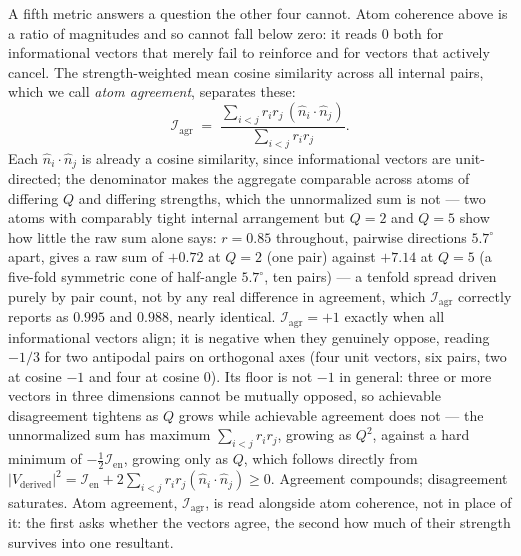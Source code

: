 \documentclass[12pt, a4paper]{article}
\begin{document}
A fifth metric answers a question the other four cannot. Atom
coherence above is a ratio of magnitudes and so cannot fall below
zero: it reads $0$ both for informational vectors that merely fail
to reinforce and for vectors that actively cancel. The
strength-weighted mean cosine similarity across all internal pairs,
which we call \emph{atom agreement}, separates these:
\begin{equation}
    \mathcal{I}_{\mathrm{agr}} \;=\;
    \frac{\sum_{i<j} r_i r_j\,(\hat n_i\cdot\hat n_j)}
         {\sum_{i<j} r_i r_j}.
    \label{eq:internal_alignment}
\end{equation}
Each $\hat n_i\cdot\hat n_j$ is already a cosine similarity, since
informational vectors are unit-directed; the denominator makes the
aggregate comparable across atoms of differing $Q$ and differing
strengths, which the unnormalized sum is not --- two atoms with
comparably tight internal arrangement but $Q=2$ and $Q=5$ show how
little the raw sum alone says: $r=0.85$ throughout, pairwise
directions $5.7^\circ$ apart, gives a raw sum of $+0.72$ at $Q=2$
(one pair) against $+7.14$ at $Q=5$ (a five-fold symmetric cone of
half-angle $5.7^\circ$, ten pairs) --- a tenfold spread driven purely by
pair count, not by any real difference in agreement, which
$\mathcal{I}_{\mathrm{agr}}$ correctly reports as $0.995$ and $0.988$,
nearly identical. $\mathcal{I}_{\mathrm{agr}}=+1$ exactly when all
informational vectors align; it is negative when they genuinely
oppose, reading $-1/3$ for two antipodal pairs on orthogonal axes
(four unit vectors, six pairs, two at cosine $-1$ and four at
cosine $0$). Its floor is not $-1$ in general: three
or more vectors in three dimensions cannot be mutually opposed, so
achievable disagreement tightens as $Q$ grows while achievable
agreement does not --- the unnormalized sum has maximum
$\sum_{i<j}r_ir_j$, growing as $Q^2$, against a hard minimum of
$-\tfrac{1}{2}\mathcal{I}_{\mathrm{en}}$, growing only as $Q$, which
follows directly from $\lvert V_{\text{derived}}\rvert^2 =
\mathcal{I}_{\mathrm{en}} + 2\sum_{i<j} r_ir_j(\hat n_i\cdot\hat n_j)
\ge 0$. Agreement compounds; disagreement saturates.
Atom agreement, $\mathcal{I}_{\mathrm{agr}}$, is read alongside atom coherence, not in place
of it: the first asks whether the vectors agree, the second how much
of their strength survives into one resultant.
\end{document}

